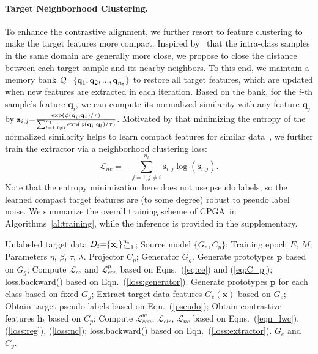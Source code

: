 \documentclass{article}
\def\ournet{CPGA}
\begin{document}
\paragraph{Target Neighborhood Clustering.} 
To enhance the contrastive alignment, we further resort to feature clustering to make the target features more compact. Inspired by~\cite{Saito2020UniversalDA} that the intra-class samples in the same domain are generally more close, we propose to close the distance between each target sample and its nearby neighbors.  
To this end, we maintain a memory bank $\mathcal{Q}\small{=} \{\textbf{q}_{1}, \textbf{q}_{2}, ...,\textbf{q}_{n_{t}}\}$ to restore all target features, which are updated when new features are extracted  in each iteration. 
Based on the bank, for the $i$-th sample's feature $\textbf{q}_i$, we can compute its normalized similarity with any feature $\textbf{q}_j$ by 
$\textbf{s}_{i,j} \small{=} \frac{\exp(\phi(\textbf{q}_i,\textbf{q}_j)/\tau)}{\sum_{l=1, l\neq i}^{n_{t}}\exp(\phi(\textbf{q}_i, \textbf{q}_{l})/\tau)}$.
Motivated by that minimizing the entropy of the normalized similarity helps to learn compact features for similar data~\cite{Saito2020UniversalDA},  we further train the extractor via a neighborhood clustering loss:
\begin{equation}
\label{loss:nc}
\mathcal{L}_{nc} = -\sum_{j=1, j\neq i}^{n_t} \textbf{s}_{i, j} \log(\textbf{s}_{i, j}).
\end{equation}
Note that the entropy minimization here does not use pseudo labels, so the learned compact target features are (to some degree) robust to pseudo label noise. We summarize the overall training scheme of \ournet~in Algorithms~\ref{al:training}, while the inference is provided in the supplementary.

\begin{algorithm}[t]
    \small
    \caption{Training of \ournet}\label{al:training}
    \begin{algorithmic}[1]
        \REQUIRE Unlabeled target data $D_t\small{=}\{\textbf{x}_i\}_{i=1}^{n_t}$; Source model $\{G_{e}, C_{y}\}$; Training epoch $E$, $M$; Parameters $\eta$, $\beta$, $\tau$, $\lambda$.
    \ENSURE Projector $C_{p}$; Generator $G_g$. 
        \STATE Generate prototypes $\textbf{p}$ based on $G_{g}$;
\STATE Compute $\mathcal{L}_{ce}$ and $\mathcal{L}_{con}^{p}$ based on Eqns.~(\ref{eq:ce}) and (\ref{eq:C_p});
\STATE loss.backward()  based on Eqn.~(\ref{loss:generator}).
    \ENDFOR
        \STATE Generate prototypes $\textbf{p}$ for each class based on fixed $G_{g}$;
        \STATE Extract target data features $G_{e}(\textbf{x})$ based on $G_e$;
        \STATE Obtain target pseudo labels based on Eqn.~(\ref{pseudo});
        \STATE Obtain contrastive features $\textbf{h}_{t}$ based on $C_{p}$; 
        \STATE Compute $\mathcal{L}_{con}^{w}$, $\mathcal{L}_{elr}$, $\mathcal{L}_{nc}$ based on Eqns.~(\ref{eqn_lwc}), (\ref{loss:reg}), (\ref{loss:nc});
\STATE loss.backward()  based on Eqn.~(\ref{loss:extractor}).
    \ENDFOR
    \RETURN $G_{e}$ and $C_{y}$.
     \end{algorithmic}
\end{algorithm}
\end{document}
